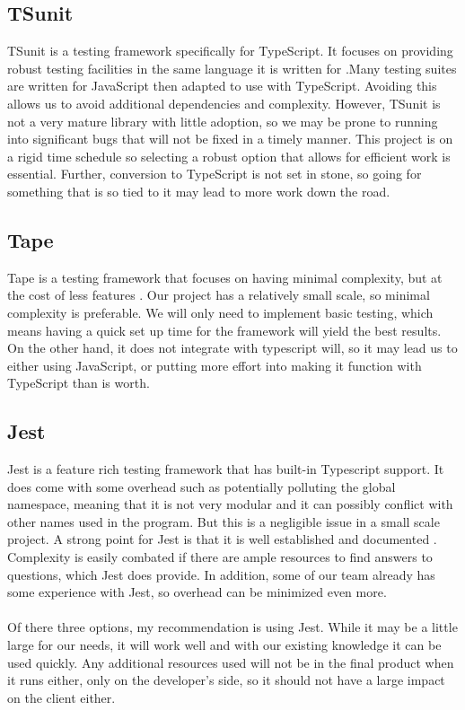     \subsection{TSunit}
        TSunit is a testing framework specifically for TypeScript. It focuses on providing robust testing facilities in the same language it is written for \cite{tsunit}.Many testing suites are written for JavaScript then adapted to use with TypeScript. Avoiding this allows us to avoid additional dependencies and complexity. However, TSunit is not a very mature library with little adoption, so we may be prone to running into significant bugs that will not be fixed in a timely manner. This project is on a rigid time schedule so selecting a robust option that allows for efficient work is essential. Further, conversion to TypeScript is not set in stone, so going for something that is so tied to it may lead to more work down the road.
    \subsection{Tape}
        Tape is a testing framework that focuses on having minimal complexity, but at the cost of less features \cite{tape}. Our project has a relatively small scale, so minimal complexity is preferable. We will only need to implement basic testing, which means having a quick set up time for the framework will yield the best results. On the other hand, it does not integrate with typescript will, so it may lead us to either using JavaScript, or putting more effort into making it function with TypeScript than is worth.
    \subsection{Jest}
        Jest is a feature rich testing framework that has built-in Typescript support. It does come with some overhead such as potentially polluting the global namespace, meaning that it is not very modular and it can possibly conflict with other names used in the program. But this is a negligible issue in a small scale project. A strong point for Jest is that it is well established and documented \cite{jest}. Complexity is easily combated if there are ample resources to find answers to questions, which Jest does provide. In addition, some of our team already has some experience with Jest, so overhead can be minimized even more.
\\\\

\indent Of there three options, my recommendation is using Jest. While it may be a little large for our needs, it will work well and with our existing knowledge it can be used quickly. Any additional resources used will not be in the final product when it runs either, only on the developer's side, so it should not have a large impact on the client either.

